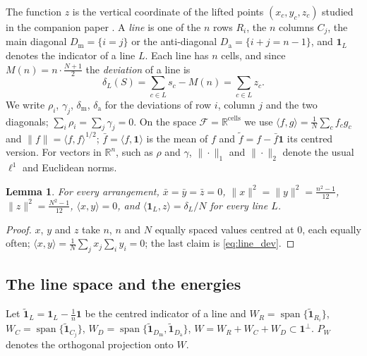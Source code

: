 \documentclass[11pt,a4paper]{article}
\theoremstyle{plain}
\newtheorem{lemma}[theorem]{Lemma}
\theoremstyle{definition}
\theoremstyle{remark}
\newcommand{\R}{\mathbb{R}}
\begin{document}
The function $z$ is the vertical coordinate of the lifted points $(x_c,y_c,z_c)$ studied in the companion paper \cite{mathewson_gems}.
A \emph{line} is one of the $n$ rows $R_i$, the $n$ columns $C_j$, the main diagonal $D_{\mathrm m}=\{i=j\}$ or the anti-diagonal $D_{\mathrm a}=\{i+j=n-1\}$, and $\mathbf 1_L$ denotes the indicator of a line $L$.
Each line has $n$ cells, and since $M(n)=n\cdot\frac{N+1}2$ the \emph{deviation} of a line is
\begin{equation}
\delta_L(S)=\sum_{c\in L}s_c-M(n)=\sum_{c\in L}z_c .
\label{eq:line_dev}
\end{equation}
We write $\rho_i$, $\gamma_j$, $\delta_{\mathrm m}$, $\delta_{\mathrm a}$ for the deviations of row $i$, column $j$ and the two diagonals; $\sum_i\rho_i=\sum_j\gamma_j=0$.
On the space $\mathcal F=\R^{\text{cells}}$ we use $\langle f,g\rangle=\frac1N\sum_cf_cg_c$ and $\|f\|=\langle f,f\rangle^{1/2}$; $\bar f=\langle f,\mathbf 1\rangle$ is the mean of $f$ and $\tilde f=f-\bar f\mathbf 1$ its centred version.
For vectors in $\R^n$, such as $\rho$ and $\gamma$, $\|\cdot\|_1$ and $\|\cdot\|_2$ denote the usual $\ell^1$ and Euclidean norms.

\begin{lemma}
\label{lem:variances}
For every arrangement, $\bar x=\bar y=\bar z=0$, $\|x\|^2=\|y\|^2=\frac{n^2-1}{12}$, $\|z\|^2=\frac{N^2-1}{12}$, $\langle x,y\rangle=0$, and $\langle\mathbf 1_L,z\rangle=\delta_L/N$ for every line $L$.
\end{lemma}

\begin{proof}
$x$, $y$ and $z$ take $n$, $n$ and $N$ equally spaced values centred at $0$, each equally often; $\langle x,y\rangle=\frac1N\sum_jx_j\sum_iy_i=0$; the last claim is \eqref{eq:line_dev}.
\end{proof}

\subsection{The line space and the energies}
\label{sec:theory_projection}

Let $\tilde{\mathbf 1}_L=\mathbf 1_L-\frac1n\mathbf 1$ be the centred indicator of a line and
$W_R=\operatorname{span}\{\tilde{\mathbf 1}_{R_i}\}$, $W_C=\operatorname{span}\{\tilde{\mathbf 1}_{C_j}\}$, $W_D=\operatorname{span}\{\tilde{\mathbf 1}_{D_{\mathrm m}},\tilde{\mathbf 1}_{D_{\mathrm a}}\}$, $W=W_R+W_C+W_D\subset\mathbf 1^\perp$.
$P_W$ denotes the orthogonal projection onto $W$.
\end{document}
